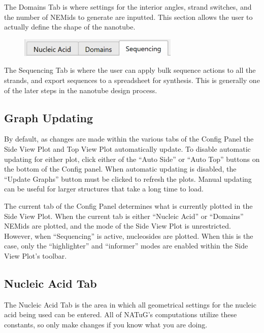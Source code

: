 \documentclass[titlepage]{article}
\begin{document}
	The Domains Tab is where settings for the interior angles, strand switches, and the number of NEMids to generate are inputted. This section allows the user to actually define the shape of the nanotube.

	\begin{figure}[h]
		\centering
		\includegraphics[width=3in]{"sequencing-tab-activated.png"}
		\label{fig:sequencing-activated}
	\end{figure}

	The Sequencing Tab is where the user can apply bulk sequence actions to all the strands, and export sequences to a spreadsheet for synthesis. This is generally one of the later steps in the nanotube design process.
	
	\subsection{Graph Updating}
	
	By default, as changes are made within the various tabs of the Config Panel the Side View Plot and Top View Plot automatically update. To disable automatic updating for either plot, click either of the “Auto Side” or “Auto Top” buttons on the bottom of the Config panel. When automatic updating is disabled, the “Update Graphs” button must be clicked to refresh the plots. Manual updating can be useful for larger structures that take a long time to load.
	
	The current tab of the Config Panel determines what is currently plotted in the Side View Plot. When the current tab is either “Nucleic Acid” or “Domains” NEMids are plotted, and the mode of the Side View Plot is unrestricted. However, when “Sequencing” is active, nucleosides are plotted. When this is the case, only the “highlighter” and “informer” modes are enabled within the Side View Plot’s toolbar.
	
	\subsection{Nucleic Acid Tab} \label{sect:nucleic-acid-tab}
	
	The Nucleic Acid Tab is the area in which all geometrical settings for the nucleic acid being used can be entered. All of NATuG’s computations utilize these constants, so only make changes if you know what you are doing.
	
\end{document}

